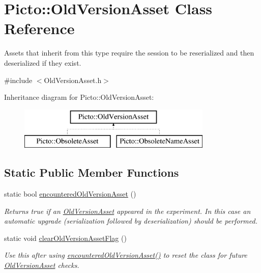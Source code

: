 \hypertarget{class_picto_1_1_old_version_asset}{\section{Picto\-:\-:Old\-Version\-Asset Class Reference}
\label{class_picto_1_1_old_version_asset}
}


Assets that inherit from this type require the session to be reserialized and then deserialized if they exist.  




{\ttfamily \#include $<$Old\-Version\-Asset.\-h$>$}

Inheritance diagram for Picto\-:\-:Old\-Version\-Asset\-:\begin{figure}[H]
\begin{center}
\leavevmode
\includegraphics[height=2.000000cm]{class_picto_1_1_old_version_asset}
\end{center}
\end{figure}
\subsection*{Static Public Member Functions}
\begin{DoxyCompactItemize}
\item 
\hypertarget{class_picto_1_1_old_version_asset_a67f8d691fef4ea596c802a85f20df9f5}{static bool \hyperlink{class_picto_1_1_old_version_asset_a67f8d691fef4ea596c802a85f20df9f5}{encountered\-Old\-Version\-Asset} ()}\label{class_picto_1_1_old_version_asset_a67f8d691fef4ea596c802a85f20df9f5}

\begin{DoxyCompactList}\small\item\em Returns true if an \hyperlink{class_picto_1_1_old_version_asset}{Old\-Version\-Asset} appeared in the experiment. In this case an automatic upgrade (serialization followed by deserialization) should be performed. \end{DoxyCompactList}\item 
\hypertarget{class_picto_1_1_old_version_asset_adcbdfbebb27a4c5d6557dde4ad026b3d}{static void \hyperlink{class_picto_1_1_old_version_asset_adcbdfbebb27a4c5d6557dde4ad026b3d}{clear\-Old\-Version\-Asset\-Flag} ()}\label{class_picto_1_1_old_version_asset_adcbdfbebb27a4c5d6557dde4ad026b3d}

\begin{DoxyCompactList}\small\item\em Use this after using \hyperlink{class_picto_1_1_old_version_asset_a67f8d691fef4ea596c802a85f20df9f5}{encountered\-Old\-Version\-Asset()} to reset the class for future \hyperlink{class_picto_1_1_old_version_asset}{Old\-Version\-Asset} checks. \end{DoxyCompactList}\end{DoxyCompactItemize}
